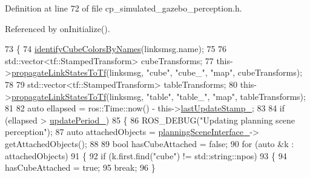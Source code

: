 Definition at line 72 of file cp\+\_\+simulated\+\_\+gazebo\+\_\+perception.\+h.



Referenced by on\+Initialize().


\begin{DoxyCode}
73             \{
74                 \hyperlink{classsm__moveit__4_1_1cl__perception__system_1_1CpSimulatedGazeboPerception_aac02fd742b0074f62d8909ce00a02d3b}{identifyCubeColorsByNames}(linksmsg.name);
75 
76                 std::vector<tf::StampedTransform> cubeTransforms;
77                 this->\hyperlink{classsm__moveit__4_1_1cl__perception__system_1_1CpSimulatedGazeboPerception_a643fa78620216085ca385b74832a0abc}{propagateLinkStatesToTf}(linksmsg, \textcolor{stringliteral}{"cube"}, \textcolor{stringliteral}{"cube\_"}, \textcolor{stringliteral}{"map"}, 
      cubeTransforms);
78 
79                 std::vector<tf::StampedTransform> tableTransforms;
80                 this->\hyperlink{classsm__moveit__4_1_1cl__perception__system_1_1CpSimulatedGazeboPerception_a643fa78620216085ca385b74832a0abc}{propagateLinkStatesToTf}(linksmsg, \textcolor{stringliteral}{"table"}, \textcolor{stringliteral}{"table\_"}, \textcolor{stringliteral}{"map"}, 
      tableTransforms);
81 
82                 \textcolor{keyword}{auto} ellapsed = ros::Time::now() - this->\hyperlink{classsm__moveit__4_1_1cl__perception__system_1_1CpSimulatedGazeboPerception_afa9d8a4f636cf06bd7dbe49ce2ca5fa8}{lastUpdateStamp\_};
83 
84                 \textcolor{keywordflow}{if} (ellapsed > \hyperlink{classsm__moveit__4_1_1cl__perception__system_1_1CpSimulatedGazeboPerception_a185c4065558b0c320d73f366bb6b8277}{updatePeriod\_})
85                 \{
86                     ROS\_DEBUG(\textcolor{stringliteral}{"Updating planning scene perception"});
87                     \textcolor{keyword}{auto} attachedObjects = \hyperlink{classsm__moveit__4_1_1cl__perception__system_1_1CpSimulatedGazeboPerception_a34bbc7a8b23a1b1c2d3d4d30bd2fe767}{planningSceneInterface\_}->
      getAttachedObjects();
88 
89                     \textcolor{keywordtype}{bool} hasCubeAttached = \textcolor{keyword}{false};
90                     \textcolor{keywordflow}{for} (\textcolor{keyword}{auto} &k : attachedObjects)
91                     \{
92                         \textcolor{keywordflow}{if} (k.first.find(\textcolor{stringliteral}{"cube"}) != std::string::npos)
93                         \{
94                             hasCubeAttached = \textcolor{keyword}{true};
95                             \textcolor{keywordflow}{break};
96                         \}

\end{DoxyCode}
